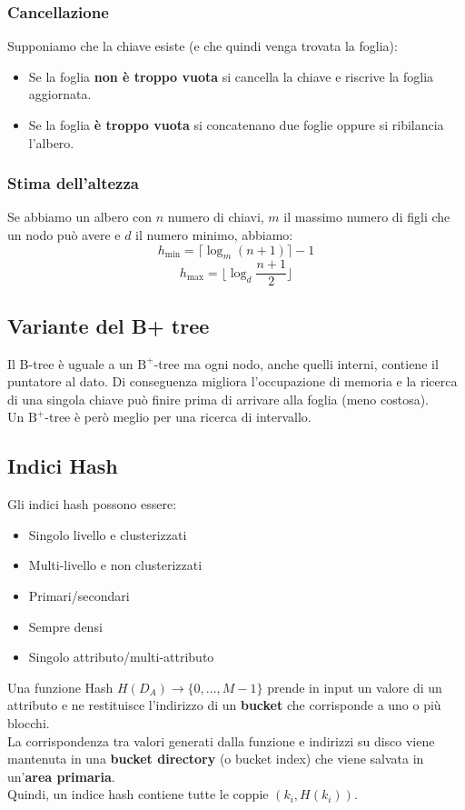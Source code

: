 \subsubsection{Cancellazione}
Supponiamo che la chiave esiste (e che quindi venga trovata la foglia):
\begin{itemize}
    \item Se la foglia \textbf{non \`e troppo vuota} si cancella la chiave e riscrive la foglia aggiornata.
    \item Se la foglia \textbf{\`e troppo vuota} si concatenano due foglie oppure si ribilancia l'albero.
\end{itemize}

\subsubsection{Stima dell'altezza}
Se abbiamo un albero con $n$ numero di chiavi, $m$ il massimo numero di figli che un nodo può avere e $d$ il numero minimo, abbiamo:
$$h_{\text{min}} = \lceil \log_m (n + 1) \rceil - 1$$
$$h_{\text{max}} = \lfloor \log_{d}\frac{n+1}{2} \rfloor$$

\subsection{Variante del B+ tree}
Il B-tree \`e uguale a un $\text{B}^+$-tree ma ogni nodo, anche quelli interni, contiene il puntatore al dato. Di conseguenza migliora l'occupazione di memoria e la ricerca di una singola chiave può finire prima di arrivare alla foglia (meno costosa).\\
Un $\text{B}^+$-tree \`e per\`o meglio per una ricerca di intervallo.

\subsection{Indici Hash}
Gli indici hash possono essere:
\begin{itemize}
    \item Singolo livello e clusterizzati
    \item Multi-livello e non clusterizzati
    \item Primari/secondari
    \item Sempre densi
    \item Singolo attributo/multi-attributo
\end{itemize}
Una funzione Hash $H(D_A) \rightarrow \{0, ..., M-1\}$ prende in input un valore di un attributo e ne restituisce l'indirizzo di un \textbf{bucket} che corrisponde a uno o più blocchi.\\
La corrispondenza tra valori generati dalla funzione e indirizzi su disco viene mantenuta in una \textbf{bucket directory} (o bucket index) che viene salvata in un'\textbf{area primaria}.\\
Quindi, un indice hash contiene tutte le coppie $(k_i,H(k_i))$.

